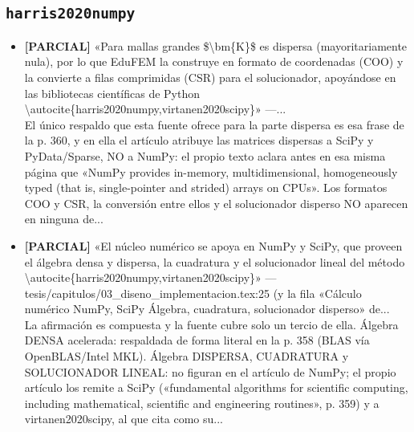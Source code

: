 \documentclass[11pt,a4paper]{article}
\newcommand{\campo}[1]{\textcolor{gris}{\footnotesize #1}}
\begin{document}
\subsection{\texttt{harris2020numpy}}
\begin{itemize}\small
\item \textbf{[PARCIAL]} «Para mallas grandes \$\textbackslash{}bm\{K\}\$ es dispersa (mayoritariamente nula), por lo que EduFEM la construye en formato de coordenadas (COO) y la convierte a filas comprimidas (CSR) para el solucionador, apoyándose en las bibliotecas científicas de Python \textbackslash{}autocite\{harris2020numpy,virtanen2020scipy\}» ---...
\\ \campo{El único respaldo que esta fuente ofrece para la parte dispersa es esa frase de la p. 360, y en ella el artículo atribuye las matrices dispersas a SciPy y PyData/Sparse, NO a NumPy: el propio texto aclara antes en esa misma página que «NumPy provides in-memory, multidimensional, homogeneously typed (that is, single-pointer and strided) arrays on CPUs». Los formatos COO y CSR, la conversión entre ellos y el solucionador disperso NO aparecen en ninguna de...}
\item \textbf{[PARCIAL]} «El núcleo numérico se apoya en NumPy y SciPy, que proveen el álgebra densa y dispersa, la cuadratura y el solucionador lineal del método \textbackslash{}autocite\{harris2020numpy,virtanen2020scipy\}» --- tesis/capitulos/03\_diseno\_implementacion.tex:25 (y la fila «Cálculo numérico \textbar{} NumPy, SciPy \textbar{} Álgebra, cuadratura, solucionador disperso» de...
\\ \campo{La afirmación es compuesta y la fuente cubre solo un tercio de ella. Álgebra DENSA acelerada: respaldada de forma literal en la p. 358 (BLAS vía OpenBLAS/Intel MKL). Álgebra DISPERSA, CUADRATURA y SOLUCIONADOR LINEAL: no figuran en el artículo de NumPy; el propio artículo los remite a SciPy («fundamental algorithms for scientific computing, including mathematical, scientific and engineering routines», p. 359) y a virtanen2020scipy, al que cita como su...}
\end{itemize}
\end{document}
